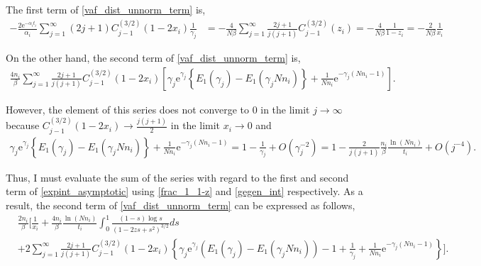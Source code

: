 \documentclass[12pt]{article}
\newcommand{\napier}{\mathrm{e}}
\begin{document}
The first term of \eqref{vaf_dist_unnorm_term} is,
\begin{align}
 - \frac{2\napier^{-\alpha_i t_i}}{\alpha_i} \sum_{j=1}^{\infty} (2j+1) C^{(3/2)}_{j-1} (1-2x_i) \frac{1}{\gamma_j} & = - \frac{4}{N\beta} \sum_{j=1}^{\infty}\frac{2j+1}{j(j+1)} C^{(3/2)}_{j-1} (z_i)
 = - \frac{4}{N\beta} \frac{1}{1-z_i}
 = - \frac{2}{N\beta} \frac{1}{x_i}\label{first_term}
\end{align}

On the other hand, the second term of \eqref{vaf_dist_unnorm_term} is,
\begin{align}
 \frac{4n_i}{\beta} \sum_{j=1}^{\infty} \frac{2j+1}{j(j+1)} C^{(3/2)}_{j-1} (1-2x_i) \left[ \gamma_j \napier^{\gamma_j} \left\{ E_1(\gamma_j) - E_1(\gamma_j Nn_i) \right\} + \frac{1}{Nn_i} \napier^{-\gamma_j (Nn_i - 1)} \right].
\end{align}

However, the element of this series does not converge to $0$ in the limit $j \to \infty$
because $C^{(3/2)}_{j-1} (1 - 2x_i)\to \frac{j(j+1)}{2}$ in the limit $x_i \to 0$ and
\begin{align}
 \gamma_j \napier^{\gamma_j} \left\{ E_1(\gamma_j) - E_1(\gamma_j Nn_i) \right\} + \frac{1}{Nn_i} \napier^{-\gamma_j (Nn_i - 1)} = 1 - \frac{1}{\gamma_j} + O(\gamma_j^{-2})
 = 1 - \frac{2}{j(j+1)} \frac{n_i}{\beta} \frac{\ln (Nn_i)}{t_i} + O(j^{-4}).\label{expint_asymptotic}
\end{align}

Thus, I must evaluate the sum of the series with regard to the first and second term of \eqref{expint_asymptotic} using \eqref{frac_1_1-z} and \eqref{gegen_int} respectively.
As a result, the second term of \eqref{vaf_dist_unnorm_term} can be expressed as follows,
\begin{align}
& \frac{2n_i}{\beta} \Biggl[ \frac{1}{x_i} + \frac{4n_i}{\beta}\frac{\ln(Nn_i)}{t_i} \int_{0}^{1} \frac{(1 - s) \log s}{ \left(1 -2zs + s^2 \right)^{3/2}} ds\nonumber\\
 & + 2 \sum_{j=1}^{\infty} \frac{2j+1}{j(j+1)} C^{(3/2)}_{j-1} (1-2x_i) \left\{ \gamma_j \napier^{\gamma_j} \left( E_1(\gamma_j) - E_1(\gamma_j Nn_i) \right) -1 + \frac{1}{\gamma_j} + \frac{1}{Nn_i} \napier^{-\gamma_j (Nn_i - 1)} \right\} \Biggr].\label{second_term}
\end{align}
\end{document}
